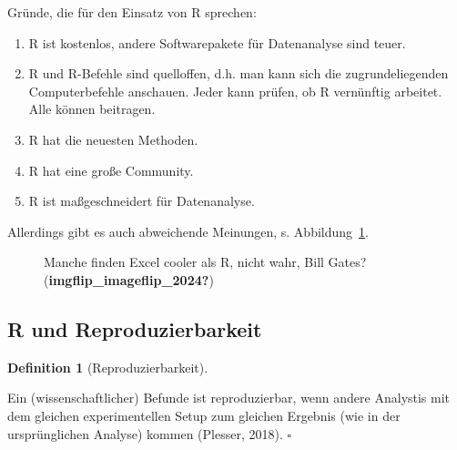 \documentclass[
  letterpaper,
]{scrbook}
\theoremstyle{definition}
\theoremstyle{definition}
\theoremstyle{definition}
\newtheorem{definition}{Definition}[chapter]
\theoremstyle{remark}
\begin{document}
Gründe, die für den Einsatz von R sprechen:

\begin{enumerate}
\def\labelenumi{\arabic{enumi}.}
\item
  R ist kostenlos, andere Softwarepakete für Datenanalyse sind teuer.
\item
  R und R-Befehle sind quelloffen, d.h. man kann sich die
  zugrundeliegenden Computerbefehle anschauen. Jeder kann prüfen, ob R
  vernünftig arbeitet. Alle können beitragen.
\item
  R hat die neuesten Methoden.
\item
  R hat eine große Community.
\item
  R ist maßgeschneidert für Datenanalyse.
\end{enumerate}

Allerdings gibt es auch abweichende Meinungen, s.
Abbildung~\ref{fig-bill-excel}.

\begin{figure}


\caption{\label{fig-bill-excel}Manche finden Excel cooler als R, nicht
wahr, Bill Gates? (\textbf{imgflip\_imageflip\_2024?})}

\end{figure}%

\subsection{R und Reproduzierbarkeit}\label{r-und-reproduzierbarkeit}

\begin{definition}[Reproduzierbarkeit]\protect\hypertarget{def-repro}{}\label{def-repro}

Ein (wissenschaftlicher) Befunde ist reproduzierbar, wenn andere
Analystis mit dem gleichen experimentellen Setup zum gleichen Ergebnis
(wie in der ursprünglichen Analyse) kommen (Plesser, 2018). \(\square\)

\end{definition}
\end{document}
